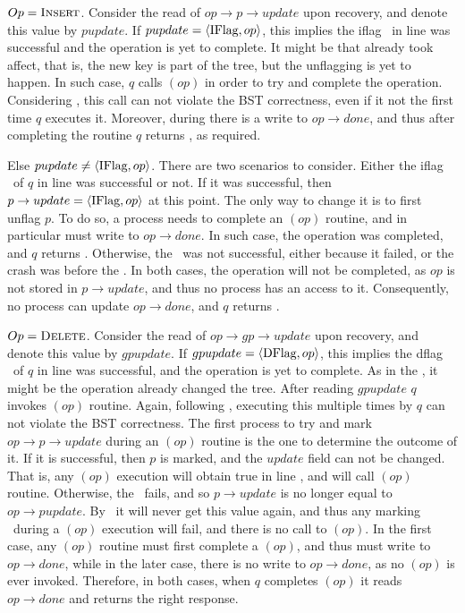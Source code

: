 $Op = \mbox{\sc Insert}$. Consider the read of $op\rightarrow p\rightarrow update$ upon recovery, and denote this value by $pupdate$. If $pupdate = \langle \mbox{IFlag}, op \rangle$, this implies the iflag \CASB\ in line  was successful and the operation is yet to complete. It might be that  already took affect, that is, the new key is part of the tree, but the unflagging is yet to happen. In such case, $q$ calls $(op)$ in order to try and complete the operation. Considering \argAnonymous, this call can not violate the BST correctness, even if it not the first time $q$ executes it. Moreover, during  there is a write to $op\rightarrow done$, and thus after completing the routine $q$ returns \TRUE, as required.

Else $pupdate \neq \langle \mbox{IFlag}, op \rangle$. There are two scenarios to consider. Either the iflag \CASB\ of $q$ in line  was successful or not. If it was successful, then $p\rightarrow update = \langle \mbox{IFlag}, op \rangle$ at this point. The only way to change it is to first unflag $p$. To do so, a process needs to complete an $(op)$ routine, and in particular must write to $op\rightarrow done$. In such case, the  operation was completed, and $q$ returns \TRUE. Otherwise, the \CASB\ was not successful, either because it failed, or the crash was before the \CASB. In both cases, the  operation will not be completed, as $op$ is not stored in $p\rightarrow update$, and thus no process has an access to it. Consequently, no process can update $op\rightarrow done$, and $q$ returns \FAIL.

$Op = \mbox{\sc Delete}$. Consider the read of $op\rightarrow gp\rightarrow update$ upon recovery, and denote this value by $gpupdate$. If $gpupdate = \langle \mbox{DFlag}, op \rangle$, this implies the dflag \CASB\ of $q$ in line  was successful, and the operation is yet to complete. As in the , it might be the operation already changed the tree. After reading $gpupdate$ $q$ invokes $(op)$ routine. Again, following \argAnonymous, executing this multiple times by $q$ can not violate the BST correctness.
The first process to try and mark $op\rightarrow p\rightarrow update$ during an $(op)$ routine is the one to determine the outcome of it. If it is successful, then $p$ is marked, and the $update$ field can not be changed. That is, any $(op)$ execution will obtain true in line , and will call $(op)$ routine. Otherwise, the \CASB\ fails, and so $p\rightarrow update$ is no longer equal to $op\rightarrow pupdate$. By \argNodeUpdate\ it will never get this value again, and thus any marking \CASB\ during a $(op)$ execution will fail, and there is no call to $(op)$. In the first case, any $(op)$ routine must first complete a $(op)$, and thus must write to $op\rightarrow done$, while in the later case, there is no write to $op\rightarrow done$, as no $(op)$ is ever invoked. Therefore, in both cases, when $q$ completes $(op)$ it reads $op\rightarrow done$ and returns the right response.


